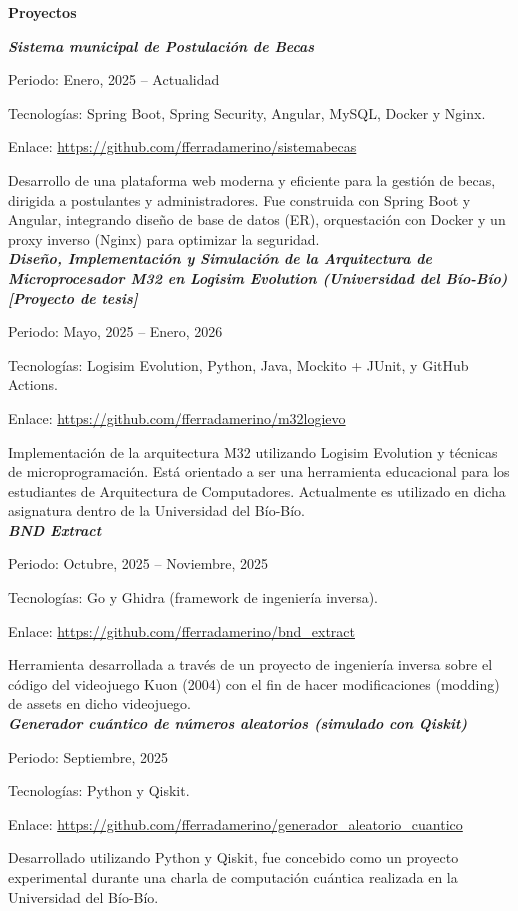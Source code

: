 \documentclass{article}
\begin{document}
	\noindent
	\textbf{Proyectos}

	\textit{\textbf{Sistema municipal de Postulación de Becas}} \par
	Periodo: Enero, 2025 -- Actualidad \par
	Tecnologías: Spring Boot, Spring Security, Angular, MySQL, Docker y Nginx. \par
	Enlace: \url{https://github.com/fferradamerino/sistemabecas} \par
	Desarrollo de una plataforma web moderna y eficiente para la gestión de becas, dirigida a postulantes y administradores. Fue construida con Spring Boot y Angular, integrando diseño de base de datos (ER), orquestación con Docker y un proxy inverso (Nginx) para optimizar la seguridad. \\
	
	\textit{\textbf{Diseño, Implementación y Simulación de la Arquitectura de Microprocesador M32 en Logisim Evolution (Universidad del Bío-Bío) [Proyecto de tesis]}} \par
	Periodo: Mayo, 2025 -- Enero, 2026 \par
	Tecnologías: Logisim Evolution, Python, Java, Mockito + JUnit, y GitHub Actions. \par
	Enlace: \url{https://github.com/fferradamerino/m32logievo} \par
	Implementación de la arquitectura M32 utilizando Logisim Evolution y técnicas de microprogramación. Está orientado a ser una herramienta educacional para los estudiantes de Arquitectura de Computadores. Actualmente  es utilizado en dicha asignatura dentro de la Universidad del Bío-Bío. \\
	
	\textit{\textbf{BND Extract}} \par
	Periodo: Octubre, 2025 -- Noviembre, 2025 \par
	Tecnologías: Go y Ghidra (framework de ingeniería inversa). \par
	Enlace: \url{https://github.com/fferradamerino/bnd\_extract} \par
	Herramienta desarrollada a través de un proyecto de ingeniería inversa sobre el código del videojuego Kuon (2004) con el fin de hacer modificaciones (modding) de assets en dicho videojuego. \\
	
	\textit{\textbf{Generador cuántico de números aleatorios (simulado con Qiskit)}} \par
	Periodo: Septiembre, 2025 \par
	Tecnologías: Python y Qiskit. \par
	Enlace: \url{https://github.com/fferradamerino/generador\_aleatorio\_cuantico} \par
	Desarrollado utilizando Python y Qiskit, fue concebido como un proyecto experimental durante una charla de computación cuántica realizada en la Universidad del Bío-Bío. \\
	
\end{document}
